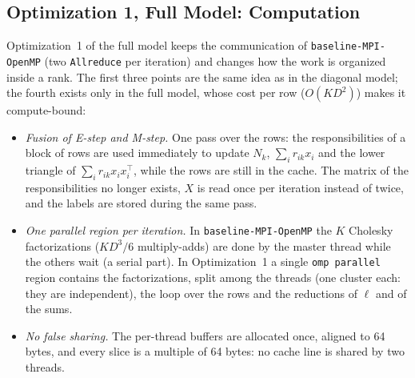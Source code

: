\documentclass[conference,onecolumn]{IEEEtran}
\newcommand{\vbase}{\texttt{baseline-\allowbreak MPI-\allowbreak OpenMP}}
\begin{document}
\subsection{Optimization 1, Full Model: Computation}
Optimization~1 of the full model keeps the communication of \vbase{} (two \texttt{Allreduce} per iteration) and changes how the work is organized inside a rank. The first three points are the same idea as in the diagonal model; the fourth exists only in the full model, whose cost per row ($O(KD^2)$) makes it compute-bound:
\begin{itemize}
\item \emph{Fusion of E-step and M-step.} One pass over the rows: the responsibilities of a block of rows are used immediately to update $N_k$, $\sum_i r_{ik}x_i$ and the lower triangle of $\sum_i r_{ik}x_ix_i^\top$, while the rows are still in the cache. The matrix of the responsibilities no longer exists, $X$ is read once per iteration instead of twice, and the labels are stored during the same pass.
\item \emph{One parallel region per iteration.} In \vbase{} the $K$ Cholesky factorizations ($KD^3/6$ multiply-adds) are done by the master thread while the others wait (a serial part). In Optimization~1 a single \texttt{omp parallel} region contains the factorizations, split among the threads (one cluster each: they are independent), the loop over the rows and the reductions of $\ell$ and of the sums.
\item \emph{No false sharing.} The per-thread buffers are allocated once, aligned to 64 bytes, and every slice is a multiple of 64 bytes: no cache line is shared by two threads.

\end{itemize}
\end{document}
